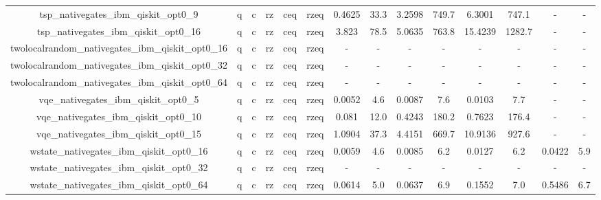 \begin{table}[htb]
{\begin{tabular}{|c|c|c|c|c|c|c|c|c|c|c|c|c|c|}
tsp_nativegates_ibm_qiskit_opt0_9 & q & c & rz & ceq & rzeq & 0.4625 & 33.3 & 3.2598 & 749.7 & 6.3001 & 747.1 & - & - \\ 
tsp_nativegates_ibm_qiskit_opt0_16 & q & c & rz & ceq & rzeq & 3.823 & 78.5 & 5.0635 & 763.8 & 15.4239 & 1282.7 & - & - \\ 
twolocalrandom_nativegates_ibm_qiskit_opt0_16 & q & c & rz & ceq & rzeq & - & - & - & - & - & - & - & - \\ 
twolocalrandom_nativegates_ibm_qiskit_opt0_32 & q & c & rz & ceq & rzeq & - & - & - & - & - & - & - & - \\ 
twolocalrandom_nativegates_ibm_qiskit_opt0_64 & q & c & rz & ceq & rzeq & - & - & - & - & - & - & - & - \\ 
vqe_nativegates_ibm_qiskit_opt0_5 & q & c & rz & ceq & rzeq & 0.0052 & 4.6 & 0.0087 & 7.6 & 0.0103 & 7.7 & - & - \\ 
vqe_nativegates_ibm_qiskit_opt0_10 & q & c & rz & ceq & rzeq & 0.081 & 12.0 & 0.4243 & 180.2 & 0.7623 & 176.4 & - & - \\ 
vqe_nativegates_ibm_qiskit_opt0_15 & q & c & rz & ceq & rzeq & 1.0904 & 37.3 & 4.4151 & 669.7 & 10.9136 & 927.6 & - & - \\ 
wstate_nativegates_ibm_qiskit_opt0_16 & q & c & rz & ceq & rzeq & 0.0059 & 4.6 & 0.0085 & 6.2 & 0.0127 & 6.2 & 0.0422 & 5.9 \\ 
wstate_nativegates_ibm_qiskit_opt0_32 & q & c & rz & ceq & rzeq & - & - & - & - & - & - & - & - \\ 
wstate_nativegates_ibm_qiskit_opt0_64 & q & c & rz & ceq & rzeq & 0.0614 & 5.0 & 0.0637 & 6.9 & 0.1552 & 7.0 & 0.5486 & 6.7 \\ 
\hline 
\end{tabular}} 
\end{table} 
